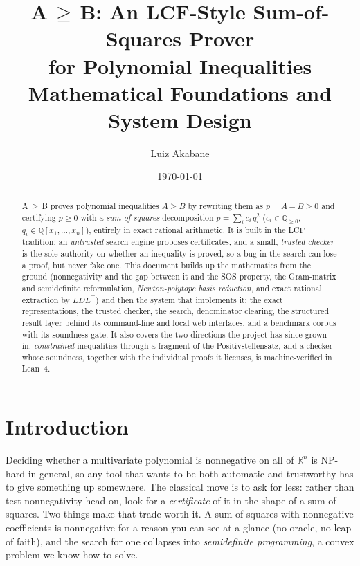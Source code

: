 \documentclass[11pt]{article}
\title{\bfseries A\,$\ge$\,B: An LCF-Style Sum-of-Squares Prover\\[2pt]
  for Polynomial Inequalities\\[6pt]
  \large Mathematical Foundations and System Design}
\author{Luiz Akabane}
\date{\today}
\theoremstyle{definition}
\theoremstyle{plain}
\newcommand{\R}{\mathbb{R}}
\newcommand{\Q}{\mathbb{Q}}
\begin{document}
\maketitle

\begin{abstract}
\noindent
A\,$\ge$\,B proves polynomial inequalities $A \ge B$ by rewriting them as
$p = A - B \ge 0$ and certifying $p \ge 0$ with a \emph{sum-of-squares}
decomposition $p = \sum_i c_i\,q_i^2$ ($c_i \in \Q_{\ge 0}$,
$q_i \in \Q[x_1,\dots,x_n]$), entirely in exact rational arithmetic. It is built
in the LCF tradition: an \emph{untrusted} search engine proposes certificates,
and a small, \emph{trusted} \emph{checker} is the sole authority on whether an
inequality is proved, so a bug in the search can lose a proof, but never fake
one. This document builds up the mathematics from the ground (nonnegativity and
the gap between it and the SOS property, the Gram-matrix and semidefinite
reformulation, \emph{Newton-polytope basis reduction}, and exact rational
extraction by $LDL^{\top}$) and then the system that implements it: the exact
representations, the trusted checker, the search, denominator clearing, the
structured result layer behind its command-line and local web interfaces, and a
benchmark corpus with its soundness gate. It also covers the two directions the
project has since grown in: \emph{constrained} inequalities through a fragment
of the Positivstellensatz, and a checker whose soundness, together with the
individual proofs it licenses, is machine-verified in Lean~4.
\end{abstract}

\tableofcontents
\bigskip

\section{Introduction}

Deciding whether a multivariate polynomial is nonnegative on all of $\R^n$ is
NP-hard in general, so any tool that wants to be both automatic and trustworthy
has to give something up somewhere. The classical move is to ask for less:
rather than test nonnegativity head-on, look for a \emph{certificate} of it in
the shape of a sum of squares. Two things make that trade worth it. A sum of
squares with nonnegative coefficients is nonnegative for a reason you can see at
a glance (no oracle, no leap of faith), and the search for one collapses into
\emph{semidefinite programming}, a convex problem we know how to solve.
\end{document}
